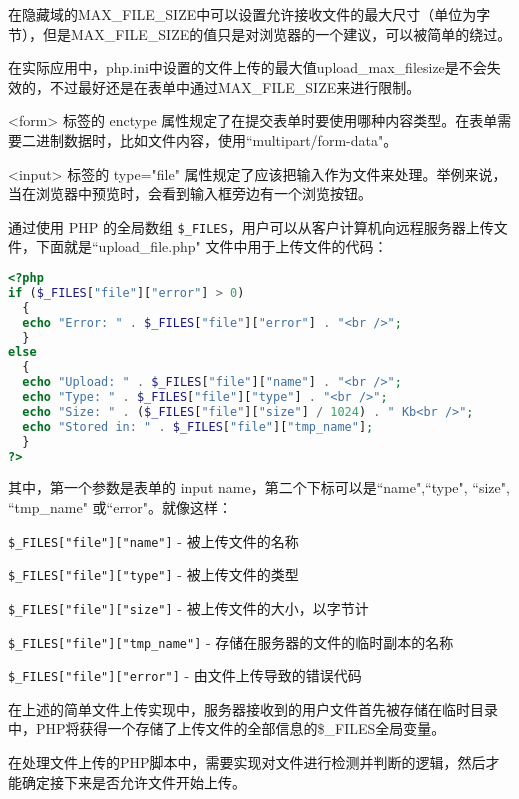 在隐藏域的MAX\_FILE\_SIZE中可以设置允许接收文件的最大尺寸（单位为字节），但是MAX\_FILE\_SIZE的值只是对浏览器的一个建议，可以被简单的绕过。

在实际应用中，php.ini中设置的文件上传的最大值upload\_max\_filesize是不会失效的，不过最好还是在表单中通过MAX\_FILE\_SIZE来进行限制。

<form> 标签的 enctype 属性规定了在提交表单时要使用哪种内容类型。在表单需要二进制数据时，比如文件内容，使用``multipart/form-data"。

<input> 标签的 type="file" 属性规定了应该把输入作为文件来处理。举例来说，当在浏览器中预览时，会看到输入框旁边有一个浏览按钮。

通过使用 PHP 的全局数组 \texttt{\$\_FILES}，用户可以从客户计算机向远程服务器上传文件，下面就是``upload\_file.php" 文件中用于上传文件的代码：



\begin{lstlisting}[language=PHP]
<?php
if ($_FILES["file"]["error"] > 0)
  {
  echo "Error: " . $_FILES["file"]["error"] . "<br />";
  }
else
  {
  echo "Upload: " . $_FILES["file"]["name"] . "<br />";
  echo "Type: " . $_FILES["file"]["type"] . "<br />";
  echo "Size: " . ($_FILES["file"]["size"] / 1024) . " Kb<br />";
  echo "Stored in: " . $_FILES["file"]["tmp_name"];
  }
?>
\end{lstlisting}

其中，第一个参数是表单的 input name，第二个下标可以是``name",``type", ``size", ``tmp\_name" 或``error"。就像这样：

\begin{compactitem}
\item \texttt{\$\_FILES["file"]["name"]} - 被上传文件的名称
\item \texttt{\$\_FILES["file"]["type"]} - 被上传文件的类型
\item \texttt{\$\_FILES["file"]["size"]} - 被上传文件的大小，以字节计
\item \texttt{\$\_FILES["file"]["tmp\_name"]} - 存储在服务器的文件的临时副本的名称
\item \texttt{\$\_FILES["file"]["error"]} - 由文件上传导致的错误代码
\end{compactitem}

在上述的简单文件上传实现中，服务器接收到的用户文件首先被存储在临时目录中，PHP将获得一个存储了上传文件的全部信息的\$\_FILES全局变量。


在处理文件上传的PHP脚本中，需要实现对文件进行检测并判断的逻辑，然后才能确定接下来是否允许文件开始上传。

